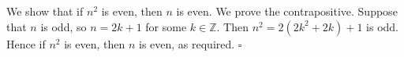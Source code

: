We show that if $n^{2}$ is even, then $n$ is even.
We prove the contrapositive.
Suppose that $n$ is odd, so $n = 2k + 1$ for some $k \in \mathbb{Z}$.
Then $n^{2} = 2(2k^{2} + 2k) + 1$ is odd.
Hence if $n^{2}$ is even, then $n$ is even, as required. \hfill$\square$